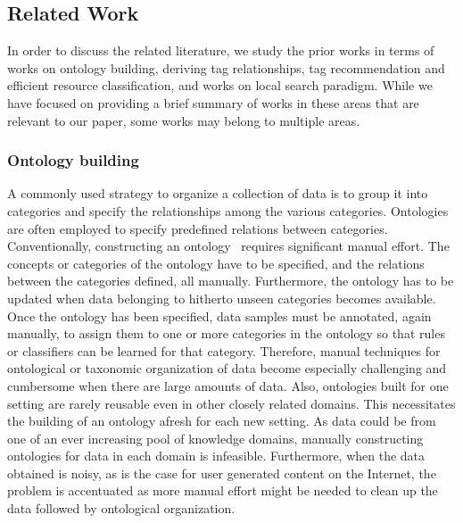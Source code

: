\subsection{Related Work}
\label{sub_sec:relatedWork}


In order to discuss the related literature, we study the prior works in terms of works on ontology building, deriving tag relationships, tag recommendation and efficient resource classification, and works on local search paradigm. While we have focused on providing a brief summary of works in these areas that are relevant to our paper, some works may belong to multiple areas. \\ 

\subsubsection{Ontology building}
A commonly used strategy to organize a collection of data is to group it into categories and specify the relationships among the various categories. Ontologies~\cite{fensel2001ontologies}  are often employed to specify predefined relations between categories. Conventionally, constructing an ontology~\cite{gruber1995toward} requires significant manual effort. The concepts or categories of the ontology have to be specified, and the relations between the categories defined, all manually. Furthermore, the ontology has to be updated when data belonging to hitherto unseen categories becomes available. Once the ontology has been specified, data samples must be annotated, again manually, to assign them to one or more categories in the ontology so that rules or classifiers can be learned for that category. Therefore, manual techniques for ontological or taxonomic organization of data become especially challenging and cumbersome when there are large amounts of data. Also, ontologies built for one setting are rarely reusable even in other closely related domains. This necessitates the building of an ontology afresh for each new setting. As data could be from one of an ever increasing pool of knowledge domains, manually constructing ontologies for data in each domain is infeasible.  Furthermore, when the data obtained is noisy, as is the case for user generated content on the Internet, the problem is accentuated as more manual effort might be needed to clean up the data followed by ontological organization. 

